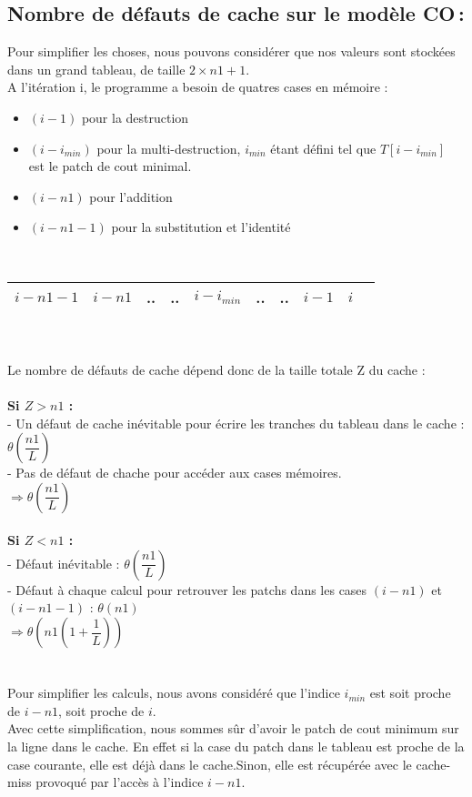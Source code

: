 \documentclass[a4paper, 10pt, french]{article}
\begin{document}
  \subsection{Nombre de défauts de cache sur le modèle CO\,: }
Pour simplifier les choses, nous pouvons considérer que nos valeurs sont stockées dans un grand tableau, de taille $2 \times n1 + 1$.\\
    A l'itération i, le programme a besoin de quatres cases en mémoire :
    \begin{itemize}
    \item $(i-1)$ pour la destruction
    \item $(i - i_{min})$ pour la multi-destruction, $i_{min}$ étant défini tel que $T[i-i_{min}]$ est le patch de cout minimal.
    \item $(i - n1)$ pour l'addition
    \item $(i - n1 - 1)$ pour la substitution et l'identité \\
    \end{itemize}
    \ \ \ \ \ \ \ \ 
    \begin{tabular}{|c|c|c|c|c|c|c|c|c|c|}
    	\hline 
    	
    	 $i - n1 - 1$ & $i - n1$  &  .. & .. & $i - i_{min}$ & .. & .. & $i - 1$ & $i$ \\
    	 
    	\hline
    \end{tabular}
	 \\ \\
	Le nombre de défauts de cache dépend donc de la taille totale Z du cache :\\ \\
	\textbf{Si $Z > n1$ :} \\
		 - Un défaut de cache inévitable pour écrire les tranches du tableau dans le cache : $\theta(\dfrac{n1}{L})$ \\
		 - Pas de défaut de chache pour accéder aux cases mémoires. \\
		 $\Rightarrow \theta(\dfrac{n1}{L})$ \\ \\ 
	\textbf{Si $Z < n1$ :} \\
	- Défaut inévitable : $\theta(\dfrac{n1}{L})$ \\
	- Défaut à chaque calcul pour retrouver les patchs dans les cases $(i - n1)$ et  $(i - n1 - 1)$ : $\theta(n1)$ \\
 	$\Rightarrow \theta(n1 (1 + \dfrac{1}{L}) )$ \\ \\
 	\\
 	Pour simplifier les calculs, nous avons considéré que l'indice $i_{min}$ est soit proche de $i - n1$, soit proche de $i$. \\
 	Avec cette simplification, nous sommes sûr d'avoir le patch de cout minimum sur la ligne dans le cache. En effet si la case du patch dans
 	le tableau est proche
 	de la case courante,  elle est déjà dans le cache.Sinon, elle est récupérée avec le cache-miss provoqué par l'accès à l'indice
 	$i - n1$.
\end{document}
